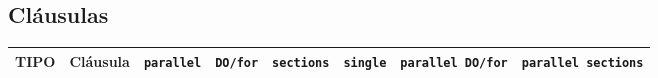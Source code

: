 \documentclass[11pt,twoside,titlepage,a4paper]{article}
\begin{document}
\begin{landscape}

\section*{Cláusulas}
\begin{center}\begin{tabular}{|c|c|c|c|c|c|c|c|}
\hline
\textbf{TIPO} & \textbf{Cláusula} & \texttt{parallel} & \texttt{DO/for} & \texttt{sections} & \texttt{single} & \texttt{parallel DO/for} & \texttt{parallel sections} \\ \hline  
\end{tabular}\end{center}

\end{landscape}
\end{document}
